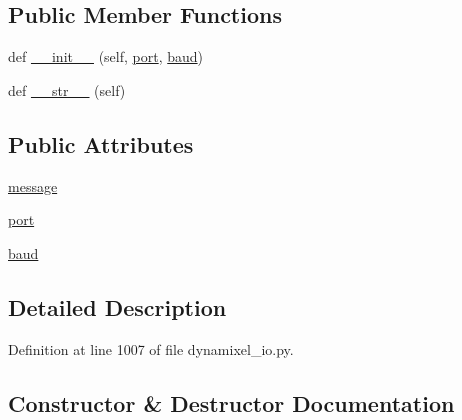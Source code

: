 \subsection*{Public Member Functions}
\begin{DoxyCompactItemize}
\item 
def \hyperlink{classdynamixel__driver_1_1dynamixel__io_1_1_serial_open_error_a5e1add91e8c6d58984f4727cc81a6fc0}{\+\_\+\+\_\+init\+\_\+\+\_\+} (self, \hyperlink{classdynamixel__driver_1_1dynamixel__io_1_1_serial_open_error_aea5b64cc7e9d7aa4e02f2b249ab9e8ae}{port}, \hyperlink{classdynamixel__driver_1_1dynamixel__io_1_1_serial_open_error_a385303335058c37e69dc646f7cd8bfee}{baud})
\item 
def \hyperlink{classdynamixel__driver_1_1dynamixel__io_1_1_serial_open_error_aef23301fe4854d8e8f06432e957af42f}{\+\_\+\+\_\+str\+\_\+\+\_\+} (self)
\end{DoxyCompactItemize}
\subsection*{Public Attributes}
\begin{DoxyCompactItemize}
\item 
\hyperlink{classdynamixel__driver_1_1dynamixel__io_1_1_serial_open_error_aec15dcf7e7e790178304aca19542b3ec}{message}
\item 
\hyperlink{classdynamixel__driver_1_1dynamixel__io_1_1_serial_open_error_aea5b64cc7e9d7aa4e02f2b249ab9e8ae}{port}
\item 
\hyperlink{classdynamixel__driver_1_1dynamixel__io_1_1_serial_open_error_a385303335058c37e69dc646f7cd8bfee}{baud}
\end{DoxyCompactItemize}


\subsection{Detailed Description}


Definition at line 1007 of file dynamixel\+\_\+io.\+py.



\subsection{Constructor \& Destructor Documentation}
\mbox{\label{classdynamixel__driver_1_1dynamixel__io_1_1_serial_open_error_a5e1add91e8c6d58984f4727cc81a6fc0}} 

